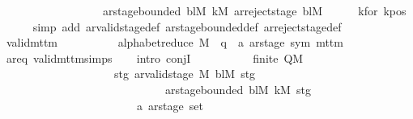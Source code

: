 \begin{isabellebody}
\ \ \ \ \ \ \ \ \ \ \ \ \ \ \ \ \ {\isasymand}\ ar{\isacharunderscore}{\kern0pt}stage{\isacharunderscore}{\kern0pt}bounded\ bl\isactrlsub M\ k\isactrlsub M\ {\isacharparenleft}{\kern0pt}ar{\isacharunderscore}{\kern0pt}reject{\isacharunderscore}{\kern0pt}stage\ bl\isactrlsub M{\isacharparenright}{\kern0pt}{\isachardoublequoteclose}\isanewline
\ \ \ \ \isamarkupfalse%
\ kfor{}\ kpos\isanewline
\ \ \ \ \isamarkupfalse%
\ {\isacharparenleft}{\kern0pt}simp\ add{\isacharcolon}{\kern0pt}\ ar{\isacharunderscore}{\kern0pt}valid{\isacharunderscore}{\kern0pt}stage{\isacharunderscore}{\kern0pt}def\ ar{\isacharunderscore}{\kern0pt}stage{\isacharunderscore}{\kern0pt}bounded{\isacharunderscore}{\kern0pt}def\ ar{\isacharunderscore}{\kern0pt}reject{\isacharunderscore}{\kern0pt}stage{\isacharunderscore}{\kern0pt}def{\isacharparenright}{\kern0pt}\isanewline
\isanewline
\ \ \isamarkupfalse%
\ {\isachardoublequoteopen}valid{\isacharunderscore}{\kern0pt}mttm\isanewline
\ \ \ \ \ \ \ \ \ \ {\isacharparenleft}{\kern0pt}alphabet{\isacharunderscore}{\kern0pt}reduce\ M\ {\isacharcolon}{\kern0pt}{\isacharcolon}{\kern0pt}\ {\isacharparenleft}{\kern0pt}{\isacharprime}{\kern0pt}q\ {\isasymtimes}\ {\isacharprime}{\kern0pt}a\ ar{\isacharunderscore}{\kern0pt}stage{\isacharcomma}{\kern0pt}\ sym{}{\isacharparenright}{\kern0pt}\ mttm{\isacharparenright}{\kern0pt}{\isachardoublequoteclose}\isanewline
\ \ \ \ \isamarkupfalse%
\ ar{\isacharunderscore}{\kern0pt}eq\ valid{\isacharunderscore}{\kern0pt}mttm{\isachardot}{\kern0pt}simps\isanewline
\ \ \isamarkupfalse%
\ {\isacharparenleft}{\kern0pt}intro\ conjI{\isacharparenright}{\kern0pt}\isanewline
\ \ \ \ %
\isanewline
\ \ \ \ \isamarkupfalse%
\ {\isachardoublequoteopen}finite\ {\isacharparenleft}{\kern0pt}Q\isactrlsub M\ {\isasymtimes}\isanewline
\ \ \ \ \ \ \ \ \ \ \ \ \ \ \ \ \ \ \ \ {\isacharparenleft}{\kern0pt}{\isacharbraceleft}{\kern0pt}stg{\isachardot}{\kern0pt}\ ar{\isacharunderscore}{\kern0pt}valid{\isacharunderscore}{\kern0pt}stage\ {\isasymGamma}\isactrlsub M\ bl\isactrlsub M\ stg\isanewline
\ \ \ \ \ \ \ \ \ \ \ \ \ \ \ \ \ \ \ \ \ \ \ \ \ \ \ \ {\isasymand}\ ar{\isacharunderscore}{\kern0pt}stage{\isacharunderscore}{\kern0pt}bounded\ bl\isactrlsub M\ k\isactrlsub M\ stg{\isacharbraceright}{\kern0pt}\isanewline
\ \ \ \ \ \ \ \ \ \ \ \ \ \ \ \ \ \ \ \ \ \ \ {\isacharcolon}{\kern0pt}{\isacharcolon}{\kern0pt}\ {\isacharprime}{\kern0pt}a\ ar{\isacharunderscore}{\kern0pt}stage\ set{\isacharparenright}{\kern0pt}{\isacharparenright}{\kern0pt}{\isachardoublequoteclose}\isanewline

\end{isabellebody}
